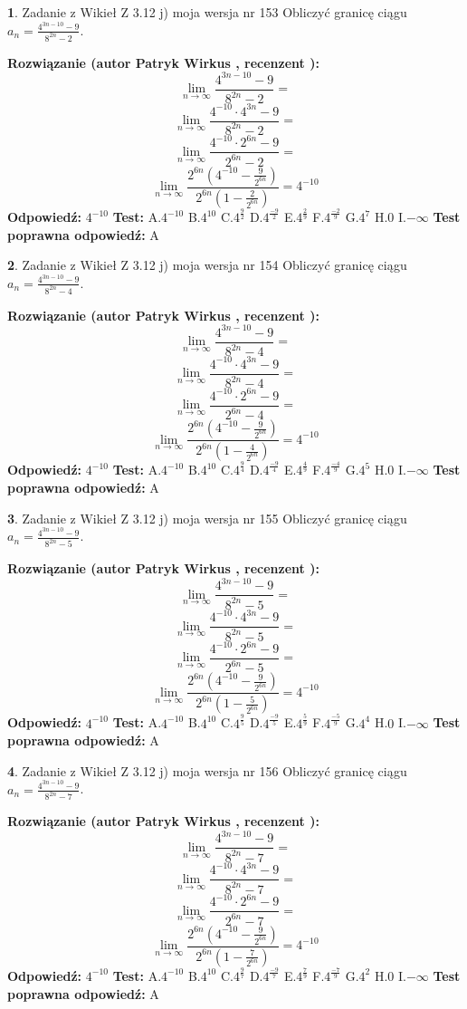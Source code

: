 \documentclass[12pt, a4paper]{article}
\theoremstyle{definition} %
\newtheorem{zad}{}
\newcommand{\zadStart}[1]{\begin{zad}#1\newline}
\newcommand{\zadStop}{\end{zad}}
\newcommand{\rozwStart}[2]{\noindent \textbf{Rozwiązanie (autor #1 , recenzent #2): }\newline}
\newcommand{\rozwStop}{\newline}
\newcommand{\odpStart}{\noindent \textbf{Odpowiedź:}\newline}
\newcommand{\odpStop}{\newline}
\newcommand{\testStart}{\noindent \textbf{Test:}\newline}
\newcommand{\testStop}{\newline}
\newcommand{\kluczStart}{\noindent \textbf{Test poprawna odpowiedź:}\newline}
\newcommand{\kluczStop}{\newline}
\begin{document}
\zadStart{Zadanie z Wikieł Z 3.12 j) moja wersja nr 153}
Obliczyć granicę ciągu $a_{n}=\frac{4^{3n-10}-9}{8^{2n}-2}$.
\zadStop
\rozwStart{Patryk Wirkus}{}
$$\lim\limits_{n\to\infty}\frac{4^{3n-10}-9}{8^{2n}-2}=$$
$$\lim\limits_{n\to\infty}\frac{4^{-10} \cdot 4^{3n}-9}{8^{2n}-2}=$$
$$\lim\limits_{n\to\infty}\frac{4^{-10} \cdot 2^{6n}-9}{2^{6n}-2}=$$
$$\lim\limits_{n\to\infty}\frac{2^{6n}(4^{-10} - \frac{9}{2^{6n}})}{2^{6n}(1-\frac{2}{2^{6n}})}= 4^{-10}$$
\rozwStop
\odpStart
$4^{-10}$
\odpStop
\testStart
A.$4^{-10}$
B.$4^{10}$
C.$4^{\frac{9}{2}}$
D.$4^{\frac{-9}{2}}$
E.$4^{\frac{2}{9}}$
F.$4^{\frac{-2}{9}}$
G.$4^{7}$
H.$0$
I.$-\infty$
\testStop
\kluczStart
A
\kluczStop



\zadStart{Zadanie z Wikieł Z 3.12 j) moja wersja nr 154}
Obliczyć granicę ciągu $a_{n}=\frac{4^{3n-10}-9}{8^{2n}-4}$.
\zadStop
\rozwStart{Patryk Wirkus}{}
$$\lim\limits_{n\to\infty}\frac{4^{3n-10}-9}{8^{2n}-4}=$$
$$\lim\limits_{n\to\infty}\frac{4^{-10} \cdot 4^{3n}-9}{8^{2n}-4}=$$
$$\lim\limits_{n\to\infty}\frac{4^{-10} \cdot 2^{6n}-9}{2^{6n}-4}=$$
$$\lim\limits_{n\to\infty}\frac{2^{6n}(4^{-10} - \frac{9}{2^{6n}})}{2^{6n}(1-\frac{4}{2^{6n}})}= 4^{-10}$$
\rozwStop
\odpStart
$4^{-10}$
\odpStop
\testStart
A.$4^{-10}$
B.$4^{10}$
C.$4^{\frac{9}{4}}$
D.$4^{\frac{-9}{4}}$
E.$4^{\frac{4}{9}}$
F.$4^{\frac{-4}{9}}$
G.$4^{5}$
H.$0$
I.$-\infty$
\testStop
\kluczStart
A
\kluczStop



\zadStart{Zadanie z Wikieł Z 3.12 j) moja wersja nr 155}
Obliczyć granicę ciągu $a_{n}=\frac{4^{3n-10}-9}{8^{2n}-5}$.
\zadStop
\rozwStart{Patryk Wirkus}{}
$$\lim\limits_{n\to\infty}\frac{4^{3n-10}-9}{8^{2n}-5}=$$
$$\lim\limits_{n\to\infty}\frac{4^{-10} \cdot 4^{3n}-9}{8^{2n}-5}=$$
$$\lim\limits_{n\to\infty}\frac{4^{-10} \cdot 2^{6n}-9}{2^{6n}-5}=$$
$$\lim\limits_{n\to\infty}\frac{2^{6n}(4^{-10} - \frac{9}{2^{6n}})}{2^{6n}(1-\frac{5}{2^{6n}})}= 4^{-10}$$
\rozwStop
\odpStart
$4^{-10}$
\odpStop
\testStart
A.$4^{-10}$
B.$4^{10}$
C.$4^{\frac{9}{5}}$
D.$4^{\frac{-9}{5}}$
E.$4^{\frac{5}{9}}$
F.$4^{\frac{-5}{9}}$
G.$4^{4}$
H.$0$
I.$-\infty$
\testStop
\kluczStart
A
\kluczStop



\zadStart{Zadanie z Wikieł Z 3.12 j) moja wersja nr 156}
Obliczyć granicę ciągu $a_{n}=\frac{4^{3n-10}-9}{8^{2n}-7}$.
\zadStop
\rozwStart{Patryk Wirkus}{}
$$\lim\limits_{n\to\infty}\frac{4^{3n-10}-9}{8^{2n}-7}=$$
$$\lim\limits_{n\to\infty}\frac{4^{-10} \cdot 4^{3n}-9}{8^{2n}-7}=$$
$$\lim\limits_{n\to\infty}\frac{4^{-10} \cdot 2^{6n}-9}{2^{6n}-7}=$$
$$\lim\limits_{n\to\infty}\frac{2^{6n}(4^{-10} - \frac{9}{2^{6n}})}{2^{6n}(1-\frac{7}{2^{6n}})}= 4^{-10}$$
\rozwStop
\odpStart
$4^{-10}$
\odpStop
\testStart
A.$4^{-10}$
B.$4^{10}$
C.$4^{\frac{9}{7}}$
D.$4^{\frac{-9}{7}}$
E.$4^{\frac{7}{9}}$
F.$4^{\frac{-7}{9}}$
G.$4^{2}$
H.$0$
I.$-\infty$
\testStop
\kluczStart
A
\kluczStop
\end{document}
